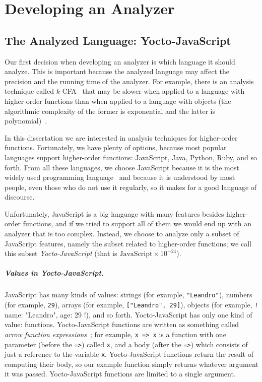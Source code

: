 \documentclass[12pt, oneside]{book}
\begin{document}
\chapter{Developing an Analyzer}


\section{The Analyzed Language: Yocto-JavaScript}

Our first decision when developing an analyzer is which language it should analyze. This is important because the analyzed language may affect the precision and the running time of the analyzer. For example, there is an analysis technique called \(k\)-CFA~\cite{k-cfa} that may be slower when applied to a language with higher-order functions than when applied to a language with objects (the algorithmic complexity of the former is exponential and the latter is polynomial)~\cite{m-cfa}.

In this dissertation we are interested in analysis techniques for higher-order functions. Fortunately, we have plenty of options, because most popular languages support higher-order functions: JavaScript, Java, Python, Ruby, and so forth. From all these languages, we choose JavaScript because it is the most widely used programming language~\cite{stack-overflow-developer-survey, jet-brains-developer-survey} and because it is understood by most people, even those who do not use it regularly, so it makes for a good language of discourse.

Unfortunately, JavaScript is a big language with many features besides higher-order functions, and if we tried to support all of them we would end up with an analyzer that is too complex. Instead, we choose to analyze only a subset of JavaScript features, namely the subset related to higher-order functions; we call this subset \emph{Yocto-JavaScript} (that is \(\mathrm{JavaScript} \times 10^{-24}\)).

\paragraph{Values in Yocto-JavaScript.}

JavaScript has many kinds of values: strings (for example, \texttt{"Leandro"}), numbers (for example, \texttt{29}), arrays (for example, \texttt{["Leandro", 29]}), objects (for example, \texttt!{ name: "Leandro", age: 29 }!), and so forth. Yocto-JavaScript has only one kind of value: functions. Yocto-JavaScript functions are written as something called \emph{arrow function expressions}~\cite{arrow-function-expressions}; for example, \texttt{x => x} is a function with one parameter (before the \texttt{=>}) called \texttt{x}, and a body (after the \texttt{=>}) which consists of just a reference to the variable \texttt{x}. Yocto-JavaScript functions return the result of computing their body, so our example function simply returns whatever argument it was passed. Yocto-JavaScript functions are limited to a single argument.
\end{document}
